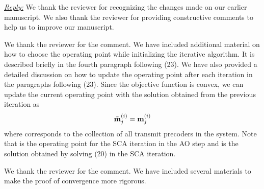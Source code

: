 
\vspace{1eM}
\underline{\textit{Reply:}} We thank the reviewer for recognizing the changes made on our earlier manuscript. We also thank the reviewer for providing constructive comments to help us to improve our manuscript.

\begin{enumerate}
 

\resp We thank the reviewer for the comment. We have included additional material on how to choose the operating point while initializing the iterative algorithm. It is described briefly in the fourth paragraph following (23). We have also provided a detailed discussion on how to update the operating point after each iteration in the paragraphs following (23). Since the objective function is convex, we can update the current operating point with the solution obtained from the previous iteration as
\begin{equation}
\tilde{\mathbf{m}}_{j}^{(i)} = \mathbf{m}_{j}^{(i)}
\end{equation}
where  corresponds to the collection of all transmit precoders in the system. Note that  is the operating point for the  \ac{SCA} iteration in the  \ac{AO} step and  is the solution obtained by solving (20) in the  \ac{SCA} iteration.

 

\resp We thank the reviewer for the comment. We have included several materials to make the proof of convergence more rigorous.


\end{enumerate}
